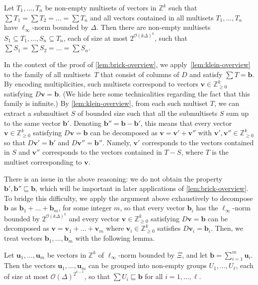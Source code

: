 \documentclass{theoretics}
\renewcommand{\geq}{\geqslant}
\newcommand{\cfleq}{\sqsubseteq}
\newcommand{\Z}{\mathbb{Z}}
\newcommand{\Zn}{\Z_{\geq 0}}
\newcommand{\tup}[1]{{\mathbf{#1}}}
\newcommand{\bb}{\tup b}
\newcommand{\uu}{\tup u}
\newcommand{\myvv}{\tup v} %
\newcommand{\Oh}{{\mathcal{O}}}
\renewcommand{\setminus}{-}
\begin{document}
\begin{lemma}\label{lem:klein-overview}
Let $T_1,\ldots,T_n$ be non-empty multisets of vectors in $\Z^k$ such that $\sum T_1=\sum T_2=\ldots=\sum T_n$ and all vectors contained in all multisets $T_1,\ldots,T_n$ have $\ell_\infty$-norm bounded by $\Delta$. Then there are non-empty multisets $S_1\subseteq T_1,\ldots,S_n\subseteq T_n$, each of size at most $2^{\Oh(k\Delta)^k}$, such that $\sum S_1=\sum S_2=\ldots=\sum S_n$.
\end{lemma}

In the context of the proof of \cref{lem:brick-overview}, we apply~\cref{lem:klein-overview} to the family of all multisets~$T$ that consist of columns of $D$ and satisfy $\sum T=\bb$. By encoding multiplicities, such multisets correspond to vectors $\myvv\in \Zn^k$ satisfying $D\myvv=\bb$. (We hide here some technicalities regarding the fact that this family is infinite.) By \cref{lem:klein-overview}, from each such multiset $T$, we can extract a submultiset $S$ of bounded size such that all the submultisets $S$ sum up to the same vector $\bb'$. Denoting $\bb''=\bb-\bb'$, this means that every vector $\myvv\in \Zn^k$ satisfying $D\myvv=\bb$ can be decomposed as $\myvv=\myvv'+\myvv''$ with $\myvv',\myvv''\in \Zn^k$ so that $D\myvv'=\bb'$ and $D\myvv''=\bb''$. Namely, $\myvv'$ corresponds to the vectors contained in $S$ and $\myvv''$ corresponds to the vectors contained in $T\setminus S$, where $T$ is the multiset corresponding to $\myvv$.

There is an issue in the above reasoning: we do not obtain the property $\bb',\bb''\cfleq \bb$, which will be important in later applications of \cref{lem:brick-overview}. To bridge this difficulty, we apply the argument above exhaustively to decompose $\bb$ as $\bb_1+\ldots+\bb_m$, for some integer $m$, so that every vector $\bb_i$ has the $\ell_\infty$-norm bounded by $2^{\Oh(k\Delta)^k}$ and every vector $\myvv\in \Zn^k$ satisfying $D\myvv=\bb$ can be decomposed as $\myvv=\myvv_1+\ldots+\myvv_m$ where $\myvv_i\in \Zn^k$ satisfies $D\myvv_i=\bb_i$. Then, we treat vectors $\bb_1,\ldots,\bb_m$ with the following lemma.

\begin{lemma}
    \label{lem:bundling-overview}
    Let $\uu_1,\ldots,\uu_m$ be vectors in $\Z^k$ of $\ell_\infty$-norm bounded by $\Xi$, and let $\bb=\sum_{i=1}^m \uu_i$. Then the vectors $\uu_1,\ldots,\uu_m$ can be grouped into non-empty groups $U_1,\ldots,U_\ell$, each of size at most $ \Oh(\Delta)^{2^{k-1}}$, so that $\sum U_i\cfleq \bb$ for all $i=1,\ldots,\ell$.
\end{lemma}
\end{document}
